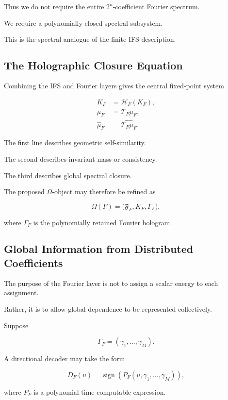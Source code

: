 \documentclass[11pt]{article}
\theoremstyle{plain}
\theoremstyle{definition}
\begin{document}
Thus we do not require the entire \(2^n\)-coefficient Fourier spectrum.

We require a polynomially closed spectral subsystem.

This is the spectral analogue of the finite IFS description.

\subsection{The Holographic Closure Equation}

Combining the IFS and Fourier layers gives the central fixed-point system

\[
\boxed{
\begin{aligned}
K_F
&=
\mathcal{H}_F(K_F),
\\[4pt]
\mu_F
&=
\mathcal{T}_F\mu_F,
\\[4pt]
\widehat{\mu}_F
&=
\widehat{\mathcal{T}_F\mu_F}.
\end{aligned}
}
\]

The first line describes geometric self-similarity.

The second describes invariant mass or consistency.

The third describes global spectral closure.

The proposed \(\Omega\)-object may therefore be refined as

\[
\boxed{
\Omega(F)
=
\bigl(
    \mathfrak{F}_F,
    K_F,
    \Gamma_F
\bigr),
}
\]

where \(\Gamma_F\) is the polynomially retained Fourier hologram.

\subsection{Global Information from Distributed Coefficients}

The purpose of the Fourier layer is not to assign a scalar energy to each
assignment.

Rather, it is to allow global dependence to be represented collectively.

Suppose

\[
    \Gamma_F
    =
    (\gamma_1,\dots,\gamma_M).
\]

A directional decoder may take the form

\[
    D_F(u)
    =
    \operatorname{sign}
    \left(
        P_F(
            u,
            \gamma_1,\dots,\gamma_M
        )
    \right),
\]

where \(P_F\) is a polynomial-time computable expression.
\end{document}
